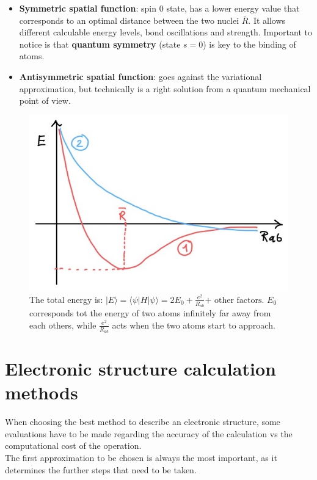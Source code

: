 	\begin{multicols}{2}
	\begin{itemize}
		\item \textbf{Symmetric spatial function}: spin $0$ state, has a lower energy value that corresponds to an optimal distance between the two nuclei $\bar{R}$.
	It allows different calculable energy levels, bond oscillations and strength.
	Important to notice is that \textbf{quantum symmetry} (state $s=0$) is key to the binding of atoms.
		\item \textbf{Antisymmetric spatial function}: goes against the variational approximation, but technically is a right solution from a quantum mechanical point of view.
	\end{itemize}
	\end{multicols}

	\begin{figure}[htbp!]
		\centering
		\includegraphics[scale=0.30]{img_9}
		\caption{The total energy is: $|E \rangle = \langle \psi | H | \psi \rangle = 2E_0 + \frac{e^2}{R_{ab}} \text{+ other factors}$.
							$E_0$ corresponds tot the energy of two atoms infinitely far away from each others, while $\frac{e^2}{R_{ab}}$ acts when the two atoms start to approach.}
		\label{fig:variational}
	\end{figure}

\section{Electronic structure calculation methods}

When choosing the best method to describe an electronic structure, some evaluations have to be made regarding the accuracy of the calculation vs the computational cost of the operation. \\
The first approximation to be chosen is always the most important, as it determines the further steps that need to be taken. \\

